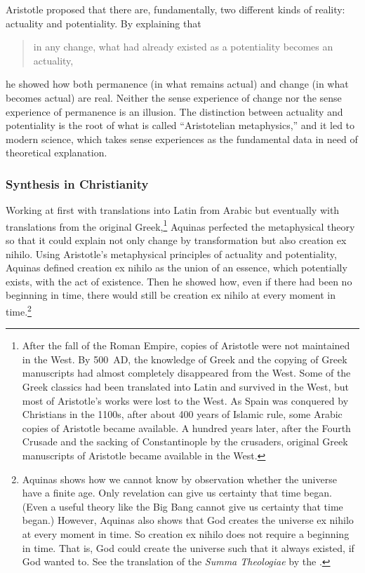 \documentclass[twocolumn]{article}
\begin{document}
Aristotle proposed that there are, fundamentally, two different kinds of
reality: actuality and potentiality.  By explaining that
\begin{quote}
   in any change, what had already existed as a potentiality becomes an
   actuality,
\end{quote}
he showed how both permanence (in what remains actual) and change (in what
becomes actual) are real. Neither the sense experience of change nor the sense
experience of permanence is an illusion.  The distinction between actuality and
potentiality is the root of what is called ``Aristotelian metaphysics,'' and it
led to modern science, which takes sense experiences as the fundamental data in
need of theoretical explanation.

\subsubsection{Synthesis in Christianity}

Working at first with translations into Latin from Arabic but eventually with
translations from the original Greek,\footnote{%
   After the fall of the Roman Empire, copies of Aristotle were not maintained
   in the West.  By 500~AD, the knowledge of Greek and the copying of Greek
   manuscripts had almost completely disappeared from the West.  Some of the
   Greek classics had been translated into Latin and survived in the West, but
   most of Aristotle's works were lost to the West.  As Spain was conquered by
   Christians in the 1100s, after about 400 years of Islamic rule, some Arabic
   copies of Aristotle became available.  A hundred years later, after the
   Fourth Crusade and the sacking of Constantinople by the crusaders, original
   Greek manuscripts of Aristotle became available in the West.%
}
Aquinas perfected the metaphysical theory so that it could explain not only
change by transformation but also creation ex nihilo.  Using Aristotle's
metaphysical principles of actuality and potentiality, Aquinas defined creation
ex nihilo as the union of an essence, which potentially exists, with the act of
existence.  Then he showed how, even if there had been no beginning in time,
there would still be creation ex nihilo at every moment in time.\footnote{%
   Aquinas shows how we cannot know by observation whether the universe have a
   finite age.  Only revelation can give us certainty that time began.  (Even a
   useful theory like the Big Bang cannot give us certainty that time began.)
   However, Aquinas also shows that God creates the universe ex nihilo at every
   moment in time.  So creation ex nihilo does not require a beginning in time.
   That is, God could create the universe such that it always existed, if God
   wanted to.  See the translation of the {\it Summa Theologiae} by the
   \citet[I, Q45, A1, and I, Q46, A1]{e1920}.
}
\end{document}
